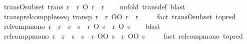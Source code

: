 \begin{isabellebody}
%
\isadelimproof
\isanewline
%
\endisadelimproof
\isanewline
{}\isamarkupfalse%
\ trans{\isacharunderscore}{\kern0pt}O{\isacharunderscore}{\kern0pt}subset{\isacharcolon}{\kern0pt}\ {\isachardoublequoteopen}trans\ r\ {\isasymLongrightarrow}\ r\ O\ r\ {\isasymsubseteq}\ r{\isachardoublequoteclose}\isanewline
%
\isadelimproof
\ \ %
\endisadelimproof
%
\isatagproof
{}\isamarkupfalse%
\ {\isacharparenleft}{\kern0pt}unfold\ trans{\isacharunderscore}{\kern0pt}def{\isacharparenright}{\kern0pt}\ blast%
\endisatagproof
{\isafoldproof}%
%
\isadelimproof
\isanewline
%
\endisadelimproof
\isanewline
{}\isamarkupfalse%
\ transp{\isacharunderscore}{\kern0pt}relcompp{\isacharunderscore}{\kern0pt}less{\isacharunderscore}{\kern0pt}eq{\isacharcolon}{\kern0pt}\ {\isachardoublequoteopen}transp\ r\ {\isasymLongrightarrow}\ r\ OO\ r\ {\isasymle}\ r\ {\isachardoublequoteclose}\isanewline
%
\isadelimproof
\ \ %
\endisadelimproof
%
\isatagproof
{}\isamarkupfalse%
\ {\isacharparenleft}{\kern0pt}fact\ trans{\isacharunderscore}{\kern0pt}O{\isacharunderscore}{\kern0pt}subset\ {\isacharbrackleft}{\kern0pt}to{\isacharunderscore}{\kern0pt}pred{\isacharbrackright}{\kern0pt}{\isacharparenright}{\kern0pt}%
\endisatagproof
{\isafoldproof}%
%
\isadelimproof
\isanewline
%
\endisadelimproof
\isanewline
{}\isamarkupfalse%
\ relcomp{\isacharunderscore}{\kern0pt}mono{\isacharcolon}{\kern0pt}\ {\isachardoublequoteopen}r{\isacharprime}{\kern0pt}\ {\isasymsubseteq}\ r\ {\isasymLongrightarrow}\ s{\isacharprime}{\kern0pt}\ {\isasymsubseteq}\ s\ {\isasymLongrightarrow}\ r{\isacharprime}{\kern0pt}\ O\ s{\isacharprime}{\kern0pt}\ {\isasymsubseteq}\ r\ O\ s{\isachardoublequoteclose}\isanewline
%
\isadelimproof
\ \ %
\endisadelimproof
%
\isatagproof
{}\isamarkupfalse%
\ blast%
\endisatagproof
{\isafoldproof}%
%
\isadelimproof
\isanewline
%
\endisadelimproof
\isanewline
{}\isamarkupfalse%
\ relcompp{\isacharunderscore}{\kern0pt}mono{\isacharcolon}{\kern0pt}\ {\isachardoublequoteopen}r{\isacharprime}{\kern0pt}\ {\isasymle}\ r\ {\isasymLongrightarrow}\ s{\isacharprime}{\kern0pt}\ {\isasymle}\ s\ {\isasymLongrightarrow}\ r{\isacharprime}{\kern0pt}\ OO\ s{\isacharprime}{\kern0pt}\ {\isasymle}\ r\ OO\ s\ {\isachardoublequoteclose}\isanewline
%
\isadelimproof
\ \ %
\endisadelimproof
%
\isatagproof
{}\isamarkupfalse%
\ {\isacharparenleft}{\kern0pt}fact\ relcomp{\isacharunderscore}{\kern0pt}mono\ {\isacharbrackleft}{\kern0pt}to{\isacharunderscore}{\kern0pt}pred{\isacharbrackright}{\kern0pt}{\isacharparenright}{\kern0pt}%

\end{isabellebody}
